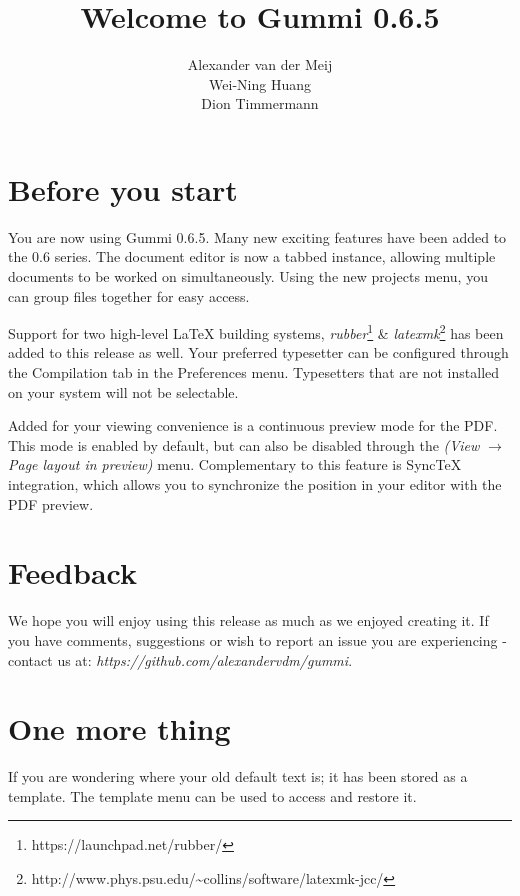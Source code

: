 \documentclass[11pt]{article}
\title{\textbf{Welcome to Gummi 0.6.5}}
\author{Alexander van der Meij\\
		Wei-Ning Huang\\
		Dion Timmermann}
\date{}
\begin{document}
\maketitle

\section{Before you start}

You are now using Gummi 0.6.5. Many new exciting features have been added to the 0.6 series. The document editor is now a tabbed instance, allowing multiple documents to be worked on simultaneously. Using the new projects menu, you can group files together for easy access. 

Support for two high-level {\LaTeX} building systems, \emph{rubber}\footnote{https://launchpad.net/rubber/} \& \emph{latexmk}\footnote{http://www.phys.psu.edu/{\textasciitilde}collins/software/latexmk-jcc/} has been added to this release as well. Your preferred typesetter can be configured through the Compilation tab in the Preferences menu. Typesetters that are not installed on your system will not be selectable. 

Added for your viewing convenience is a continuous preview mode for the PDF. This mode is enabled by default, but can also be disabled through the \emph{(View $\rightarrow$ Page layout in preview)} menu. Complementary to this feature is SyncTeX integration, which allows you to synchronize the position in your editor with the PDF preview. 

\section{Feedback}
We hope you will enjoy using this release as much as we enjoyed creating it. If you have comments, suggestions or wish to report an issue you are experiencing - contact us at: \emph{https://github.com/alexandervdm/gummi}.

\section{One more thing}
If you are wondering where your old default text is; it has been stored as a template. The template menu can be used to access and restore it. 
\end{document}
